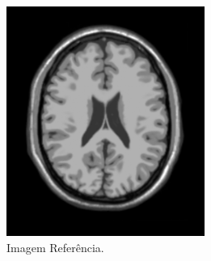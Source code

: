 \documentclass[t]{beamer}
\begin{document}
\begin{frame}
   \begin{columns}[c]
        \begin{figure}[!h]
          \begin{center}
            \includegraphics[width=1.0\textwidth]{../images/screen.png}
            \caption{Imagem Referência.}
          \end{center}
        \end{figure}
        \begin{figure}[!h]
          \begin{center}

\end{center}
\end{figure}
\end{columns}
\end{frame}
\end{document}
